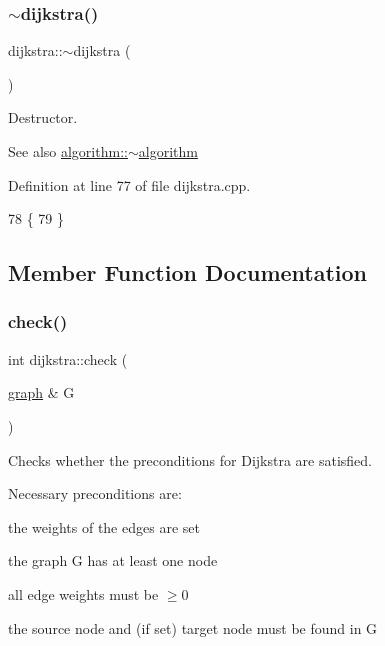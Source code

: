 \subsubsection{\texorpdfstring{$\sim$dijkstra()}{~dijkstra()}}
{\footnotesize\ttfamily dijkstra\+::$\sim$dijkstra (\begin{DoxyParamCaption}{ }\end{DoxyParamCaption})\hspace{0.3cm}{\ttfamily [virtual]}}



Destructor. 

\begin{DoxySeeAlso}{See also}
\mbox{\hyperlink{classalgorithm_adca9b1e7fa3afd914519a9dbb44e9fd5}{algorithm\+::$\sim$algorithm}} 
\end{DoxySeeAlso}


Definition at line 77 of file dijkstra.\+cpp.


\begin{DoxyCode}
78 \{
79 \}
\end{DoxyCode}


\subsection{Member Function Documentation}
\mbox{\label{classdijkstra_a51ff4657e0ddb1ca5231a21e6dea1808}} 
\subsubsection{\texorpdfstring{check()}{check()}}
{\footnotesize\ttfamily int dijkstra\+::check (\begin{DoxyParamCaption}\item[{\mbox{\hyperlink{classgraph}{graph}} \&}]{G }\end{DoxyParamCaption})\hspace{0.3cm}{\ttfamily [virtual]}}



Checks whether the preconditions for Dijkstra are satisfied. 

Necessary preconditions are\+:
\begin{DoxyItemize}
\item the weights of the edges are set
\item the graph {\ttfamily G} has at least one node
\item all edge weights must be $\ge 0$
\item the source node and (if set) target node must be found in {\ttfamily G} 
\end{DoxyItemize}



